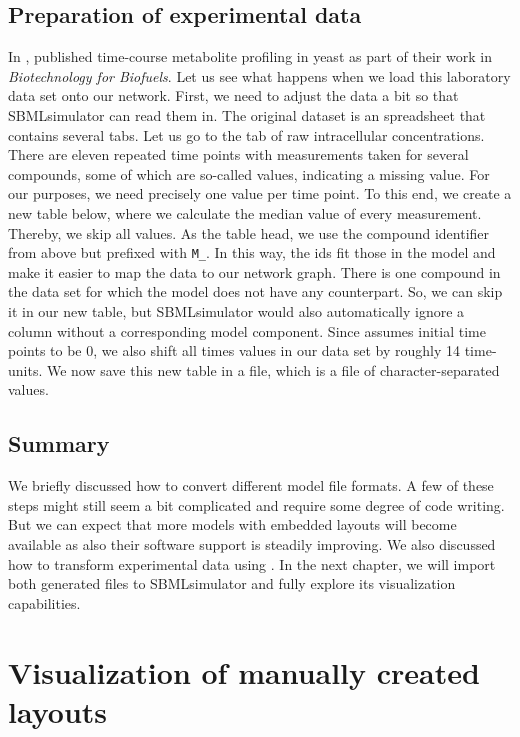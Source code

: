 \section{Preparation of experimental data}

In \citeyear{Bergdahl2012}, \citeauthor{Bergdahl2012} published time-course metabolite profiling in yeast as part of their work in \emph{Biotechnology for Biofuels}.
Let us see what happens when we load this laboratory data set onto our network.
First, we need to adjust the data a bit so that SBMLsimulator can read them in.
The original dataset is an \Excel spreadsheet that contains several tabs.
Let us go to the tab of raw intracellular concentrations.
There are eleven repeated time points with measurements taken for several compounds, some of which are so-called \NaN values, indicating a missing value.
For our purposes, we need precisely one value per time point.
To this end, we create a new table below, where we calculate the median value of every measurement.
Thereby, we skip all \NaN values.
As the table head, we use the compound identifier from above but prefixed with \texttt{M\_}.
In this way, the ids fit those in the \SBML model and make it easier to map the data to our network graph.
There is one compound in the data set for which the model does not have any counterpart.
So, we can skip it in our new table, but SBMLsimulator would also automatically ignore a column without a corresponding model component.
Since \SBML assumes initial time points to be 0, we also shift all times values in our data set by roughly 14 time-units.
We now save this new table in a \CSV file, which is a file of character-separated values.

\section{Summary}

We briefly discussed how to convert different model file formats.
A few of these steps might still seem a bit complicated and require some degree of code writing.
But we can expect that more models with embedded layouts will become available as also their software support is steadily improving.
We also discussed how to transform experimental data using \Excel.
In the next chapter, we will import both generated files to SBMLsimulator and fully explore its visualization capabilities.


\chapter{Visualization of manually created layouts}

